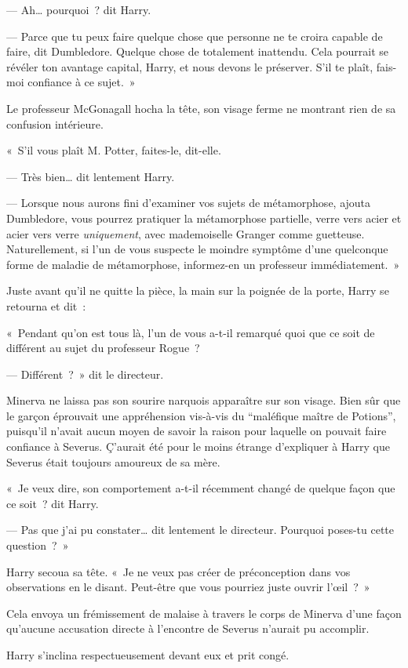 --- Ah… pourquoi~? dit Harry.

--- Parce que tu peux faire quelque chose que personne ne te croira capable de faire, dit Dumbledore.
Quelque chose de totalement inattendu.
Cela pourrait se révéler ton avantage capital, Harry, et nous devons le préserver.
S'il te plaît, fais-moi confiance à ce sujet.~»

Le professeur McGonagall hocha la tête, son visage ferme ne montrant rien de sa confusion intérieure.

«~S'il vous plaît M. Potter, faites-le, dit-elle.

--- Très bien… dit lentement Harry.

--- Lorsque nous aurons fini d'examiner vos sujets de métamorphose, ajouta Dumbledore, vous pourrez pratiquer la métamorphose partielle, verre vers acier et acier vers verre \emph{uniquement}, avec mademoiselle Granger comme guetteuse.
Naturellement, si l'un de vous suspecte le moindre symptôme d'une quelconque forme de maladie de métamorphose, informez-en un professeur immédiatement.~»

Juste avant qu'il ne quitte la pièce, la main sur la poignée de la porte, Harry se retourna et dit~:

«~Pendant qu'on est tous là, l'un de vous a-t-il remarqué quoi que ce soit de différent au sujet du professeur Rogue~?

--- Différent~?~»
dit le directeur.

Minerva ne laissa pas son sourire narquois apparaître sur son visage.
Bien sûr que le garçon éprouvait une appréhension vis-à-vis du “maléfique maître de Potions”, puisqu'il n'avait aucun moyen de savoir la raison pour laquelle on pouvait faire confiance à Severus.
Ç'aurait été pour le moins étrange d'expliquer à Harry que Severus était toujours amoureux de sa mère.

«~Je veux dire, son comportement a-t-il récemment changé de quelque façon que ce soit~? dit Harry.

--- Pas que j'ai pu constater… dit lentement le directeur.
Pourquoi poses-tu cette question~?~»

Harry secoua sa tête.
«~Je ne veux pas créer de préconception dans vos observations en le disant.
Peut-être que vous pourriez juste ouvrir l'œil~?~»

Cela envoya un frémissement de malaise à travers le corps de Minerva d'une façon qu'aucune accusation directe à l'encontre de Severus n'aurait pu accomplir.

Harry s'inclina respectueusement devant eux et prit congé.

